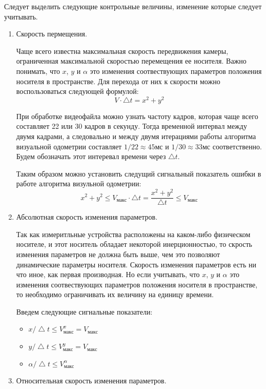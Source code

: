 Следует выделить следующие контрольные величины, изменение которые следует учитывать.
\begin{enumerate}
\item Скорость пермещения. 

Чаще всего известна максимальная скорость передвижения камеры, ограниченная максимальной скоростью перемещения ее носителя. Важно понимать, что $x$, $y$ и $\alpha$ это изменения соотвествующих параметров положения носителя в пространстве. Для перехода от них к скорости можно воспользоваться следующей формулой:
 $$ V \cdot \bigtriangleup t = x^2 + y^2 $$

При обработке видеофайла можно узнать частоту кадров, которая чаще всего составляет 22 или 30 кадров в секунду. Тогда временной интервал между двумя кадрами, а следовально и между двумя итерациями работы алгоритма визуальной одометрии составляет $1/22 \approx 45 мс$ и $ 1/30 \approx 33 мс$ соответственно. Будем обозначать этот интеревал времени через $\bigtriangleup t$.

Таким образом можно установить следущий сигнальный показатель ошибки в работе алгоритма визульной одометрии:
$$  x^2 + y^2  \leqslant V_{макс} \cdot \bigtriangleup t = 
\frac{x^2 + y^2}{\bigtriangleup t} \leqslant V_{макс}
$$

\item Абсолютная скорость изменения параметров.

Так как измеритльные устройства расположены на каком-либо физическом носителе, и этот носитель обладает некоторой инерционностью, то скрость изменения параметров не должна быть выше, чем это позволяют динамические параметры носителя. Скорость изменения параметров есть ни что иное, как первая производная. Но если учитывать, что  $x$, $y$ и $\alpha$ это изменения соотвествующих параметров положения носителя в пространстве, то необходимо ограничивать их величину на единицу времени. 



Введем следующие сигнальные показатели:
\begin{itemize}
\item $x/ \bigtriangleup t \leqslant V_{макс}^x = V_{макс}$
\item $y / \bigtriangleup t \leqslant V_{макс}^y = V_{макс}$
\item $\alpha / \bigtriangleup t \leqslant V_{макс}^{\alpha}$
\end{itemize}

\item Относительная скорость изменения параметров.


\end{enumerate}
